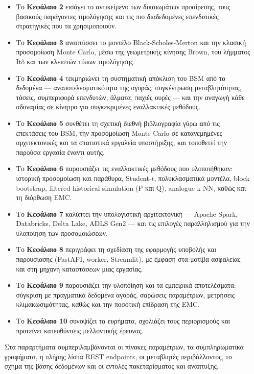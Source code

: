 \documentclass[12pt]{article}
\begin{document}
\begin{itemize}
  \item Το \textbf{Κεφάλαιο 2} εισάγει το αντικείμενο των δικαιωμάτων προαίρεσης, τους βασικούς παράγοντες τιμολόγησης και τις πιο διαδεδομένες επενδυτικές στρατηγικές που τα χρησιμοποιούν.
  \item Το \textbf{Κεφάλαιο 3} αναπτύσσει το μοντέλο Black-Scholes-Merton και την κλασική προσομοίωση Monte Carlo, μέσω της γεωμετρικής κίνησης Brown, του λήμματος Itô και των κλειστών τύπων τιμολόγησης.
  \item Το \textbf{Κεφάλαιο 4} τεκμηριώνει τη συστηματική απόκλιση του BSM από τα δεδομένα — αναποτελεσματικότητα της αγοράς, συγκέντρωση μεταβλητότητας, τάσεις, συμπεριφορά επενδυτών, άλματα, παχιές ουρές — και την αναγωγή κάθε αδυναμίας σε κίνητρο για συγκεκριμένες εναλλακτικές μεθόδους.
  \item Το \textbf{Κεφάλαιο 5} συνθέτει τη σχετική διεθνή βιβλιογραφία γύρω από τις επεκτάσεις του BSM, την προσομοίωση Monte Carlo σε κατανεμημένες αρχιτεκτονικές και τα στατιστικά εργαλεία υποστήριξης, και τοποθετεί την παρούσα εργασία έναντι αυτής.
  \item Το \textbf{Κεφάλαιο 6} παρουσιάζει τις εναλλακτικές μεθόδους που υλοποιήθηκαν: ιστορική προσομοίωση και παράθυρα, Student-$t$, πολυκλασματικά μοντέλα, block bootstrap, filtered historical simulation (P και Q), analogue k-NN, καθώς και τη διόρθωση EMC.
  \item Το \textbf{Κεφάλαιο 7} καλύπτει την υπολογιστική αρχιτεκτονική — Apache Spark, Databricks, Delta Lake, ADLS Gen2 — και τις επιλογές παραλληλισμού για την υλοποίηση των προσομοιώσεων.
  \item Το \textbf{Κεφάλαιο 8} περιγράφει τη σχεδίαση της εφαρμογής υποβολής και παρουσίασης (FastAPI, worker, Streamlit), με έμφαση στα μοτίβα ασφαλείας και στη μηχανή καταστάσεων μιας εργασίας.
  \item Το \textbf{Κεφάλαιο 9} παρουσιάζει την υλοποίηση και τα εμπειρικά αποτελέσματα: σύγκριση με πραγματικά δεδομένα αγοράς, σαρώσεις παραμέτρων, μετρήσεις κλιμακωσιμότητας, καθώς και την ποσοτική επίδραση της EMC.
  \item Το \textbf{Κεφάλαιο 10} συνοψίζει τα ευρήματα, σχολιάζει τους περιορισμούς και προτείνει κατευθύνσεις μελλοντικής έρευνας.
\end{itemize}

Στα παραρτήματα συμπεριλαμβάνονται οι πίνακες παραμέτρων, τα συμπληρωματικά γραφήματα, η πλήρης λίστα REST endpoints, οι μεταβλητές περιβάλλοντος, το σχήμα της βάσης δεδομένων και οι εντολές πακεταρίσματος και ανάπτυξης.
\end{document}
